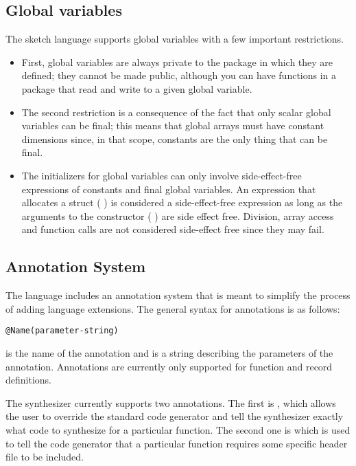 \subsection{Global variables}
The sketch language supports global variables with a few important restrictions.
\begin{itemize}
\item First, global variables are always private to the package in which they are defined; they cannot be made public, although you can have functions in a package that read and write to a given global variable.
\item The second restriction is a consequence of the fact that only scalar global variables can be final; this means that global arrays must have constant dimensions since, in that scope, constants are the only thing that can be final.

\item The initializers for global variables can only involve side-effect-free expressions of constants and final global variables. An expression that allocates a struct (\eg{} ) is considered a side-effect-free expression as long as the arguments to the constructor (\eg{} ) are side effect free. Division, array access and function calls are not considered side-effect free since they may fail.
\end{itemize}

\subsection{Annotation System}
The \Sk{} language includes an annotation system that is meant to simplify the process of adding language extensions. The general syntax for annotations is as follows:
\begin{lstlisting}
@Name(parameter-string)
\end{lstlisting}
 is the name of the annotation and  is a string describing the parameters of the annotation. Annotations are currently only supported for function and record definitions.

The synthesizer currently supports two annotations. The first is , which allows the user to override the standard code generator and tell the synthesizer exactly what code to synthesize for a particular function. The second one is  which is used to tell the code generator that a particular function requires some specific header file to be included.

